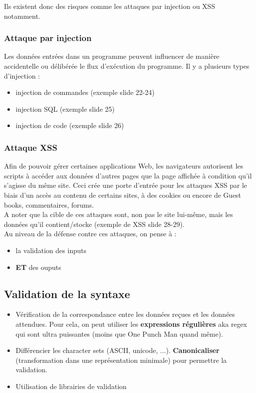 \documentclass{report}
\begin{document}
Ils existent donc des risques comme les attaques par injection ou XSS notamment.

\subsubsection{Attaque par injection}

Les données entrées dans un programme peuvent influencer de manière accidentelle ou délibérée le flux d'exécution du programme. Il y a plusieurs types d'injection :
\begin{itemize}
    \item injection de commandes (exemple slide 22-24)
    \item injection SQL (exemple slide 25)
    \item injection de code (exemple slide 26)
\end{itemize}

\subsubsection{Attaque XSS}

Afin de pouvoir gérer certaines applications Web, les navigateurs autorisent les scripts à accéder aux données d'autres pages que la page affichée à condition qu'il s'agisse du même site. Ceci crée une porte d'entrée pour les attaques XSS par le biais d'un accès au contenu de certains sites, à des cookies ou encore de Guest books, commentaires, forums.\\ A noter que la cible de ces attaques sont, non pas le site lui-même, mais les données qu'il contient/stocke (exemple de XSS slide 28-29).\\

Au niveau de la défense contre ces attaques, on pense à :
\begin{itemize}
    \item la validation des inputs
    \item \textbf{ET} des ouputs
\end{itemize}

\subsection{Validation de la syntaxe}

\begin{itemize}
    \item Vérification de la correspondance entre les données reçues et les données attendues. Pour cela, on peut utiliser les \textbf{expressions régulières} aka regex qui sont ultra puissantes (moins que One Punch Man quand même).

    \item Différencier les character sets (ASCII, unicode, ...). \textbf{Canonicaliser} (transformation dans une représentation minimale) pour permettre la validation.

    \item Utilisation de librairies de validation
\end{itemize}
\end{document}
